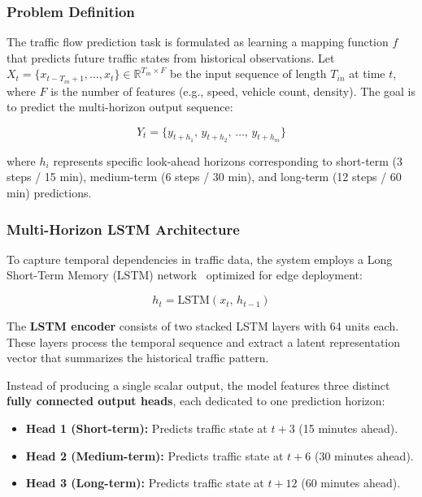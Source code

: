 \documentclass[pdflatex,sn-mathphys-num]{sn-jnl}
\theoremstyle{thmstyleone}
\theoremstyle{thmstyletwo}
\theoremstyle{thmstylethree}
\begin{document}
\subsubsection{Problem Definition}

The traffic flow prediction task is formulated as learning a mapping function $f$
that predicts future traffic states from historical observations. Let
$X_t = \{x_{t-T_{in}+1}, \ldots, x_t\} \in \mathbb{R}^{T_{in} \times F}$ be
the input sequence of length $T_{in}$ at time $t$, where $F$ is the number of
features (e.g., speed, vehicle count, density). The goal is to predict the
multi-horizon output sequence:

\begin{equation}
    Y_t = \{y_{t+h_1},\, y_{t+h_2},\, \ldots,\, y_{t+h_m}\}
    \label{eq:problem_def}
\end{equation}

\noindent where $h_i$ represents specific look-ahead horizons corresponding to
short-term (3 steps / 15 min), medium-term (6 steps / 30 min), and long-term
(12 steps / 60 min) predictions.

\subsubsection{Multi-Horizon LSTM Architecture}

To capture temporal dependencies in traffic data, the system employs a
Long Short-Term Memory (LSTM) network~\cite{hochreiter1997lstm} optimized for
edge deployment:

\begin{equation}
    h_t = \mathrm{LSTM}(x_t,\, h_{t-1})
    \label{eq:lstm_hidden}
\end{equation}

The \textbf{LSTM encoder} consists of two stacked LSTM layers with 64 units
each. These layers process the temporal sequence and extract a latent
representation vector that summarizes the historical traffic pattern.

Instead of producing a single scalar output, the model features three distinct
\textbf{fully connected output heads}, each dedicated to one prediction horizon:

\begin{itemize}
    \item \textbf{Head 1 (Short-term):} Predicts traffic state at $t+3$
    (15 minutes ahead).
    \item \textbf{Head 2 (Medium-term):} Predicts traffic state at $t+6$
    (30 minutes ahead).
    \item \textbf{Head 3 (Long-term):} Predicts traffic state at $t+12$
    (60 minutes ahead).
\end{itemize}
\end{document}

